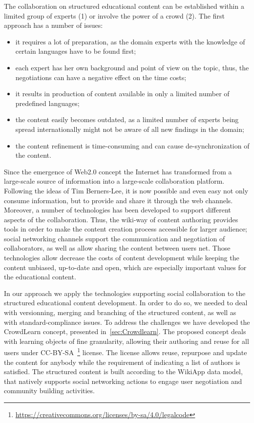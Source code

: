 \documentclass[ngerman,UKenglish,table]{scrbook}
\begin{document}
The collaboration on structured educational content can be established within a limited group of experts (1) or involve the power of a crowd (2).
The first approach has a number of issues:
\begin{itemize}
\item it requires a lot of preparation, as the domain experts with the knowledge of certain languages have to be found first;
\item each expert has her own background and point of view on the topic, thus, the negotiations can have a negative effect on the time costs; 
\item it results in production of content available in only a limited number of predefined languages;
\item the content easily becomes outdated, as a limited number of experts being spread internationally might not be aware of all new findings in the domain;
\item the content refinement is time-consuming and can cause de-synchronization of the content.
\end{itemize}

Since the emergence of Web2.0 concept the Internet has transformed from a large-scale source of information into a large-scale collaboration platform.
Following the ideas of Tim Berners-Lee, it is now possible and even easy not only consume information, but to provide and share it through the web channels.
Moreover, a number of technologies has been developed to support different aspects of the collaboration.
Thus, the wiki-way of content authoring provides tools in order to make the content creation process accessible for larger audience; social networking channels support the communication and negotiation of collaborators, as well as allow sharing the content between users net.
Those technologies allow decrease the costs of content development while keeping the content unbiased, up-to-date and open, which are especially important values for the educational content.

In our approach we apply the technologies supporting social collaboration to the structured educational content development.
In order to do so, we needed to deal with versionning, merging and branching of the structured content, as well as with standard-compliance issues.
To address the challenges we have developed the CrowdLearn concept, presented in~\autoref{sec:Crowdlearn}.
The proposed concept deals with learning objects of fine granularity, allowing their authoring and reuse for all users under CC-BY-SA~\footnote{\url{https://creativecommons.org/licenses/by-sa/4.0/legalcode}} license.
The license allows reuse, repurpose and update the content for anybody while the requirement of indicating a list of authors is satisfied.
The structured content is built according to the WikiApp data model, that natively supports social networking actions to engage user negotiation and community building activities.
\end{document}
